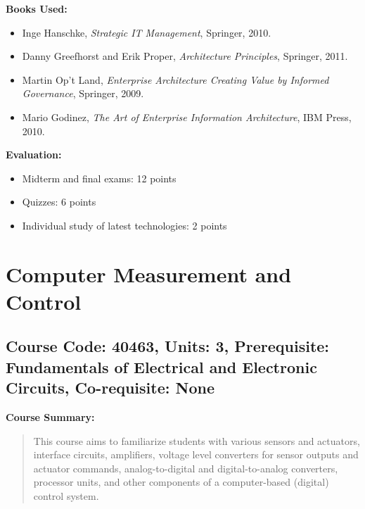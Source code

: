 \documentclass[12pt]{article}
\begin{document}
\textbf{Books Used:}
\begin{itemize}
    \item Inge Hanschke, \textit{Strategic IT Management}, Springer, 2010.
    \item Danny Greefhorst and Erik Proper, \textit{Architecture Principles}, Springer, 2011.
    \item Martin Op't Land, \textit{Enterprise Architecture Creating Value by Informed Governance}, Springer, 2009.
    \item Mario Godinez, \textit{The Art of Enterprise Information Architecture}, IBM Press, 2010.
\end{itemize}

\textbf{Evaluation:}
\begin{itemize}
    \item Midterm and final exams: 12 points
    \item Quizzes: 6 points
    \item Individual study of latest technologies: 2 points
\end{itemize}

\newpage

\section{Computer Measurement and Control}
\subsection*{Course Code: 40463, Units: 3, Prerequisite: Fundamentals of Electrical and Electronic Circuits, Co-requisite: None}

\textbf{Course Summary:} 
\begin{quote}
This course aims to familiarize students with various sensors and actuators, interface circuits, amplifiers, voltage level converters for sensor outputs and actuator commands, analog-to-digital and digital-to-analog converters, processor units, and other components of a computer-based (digital) control system.
\end{quote}
\end{document}
